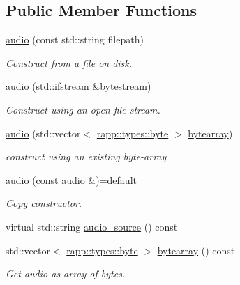 \subsection*{Public Member Functions}
\begin{DoxyCompactItemize}
\item 
\hyperlink{classrapp_1_1object_1_1audio_a01c7492e030076cf3f579fee73990b96}{audio} (const std\-::string filepath)
\begin{DoxyCompactList}\small\item\em Construct from a file on disk. \end{DoxyCompactList}\item 
\hyperlink{classrapp_1_1object_1_1audio_a5f8b8dea6ffe4c30bb7af66244a3cd48}{audio} (std\-::ifstream \&bytestream)
\begin{DoxyCompactList}\small\item\em Construct using an open file stream. \end{DoxyCompactList}\item 
\hyperlink{classrapp_1_1object_1_1audio_af6cb71fb68efdfa45194b640d6076d94}{audio} (std\-::vector$<$ \hyperlink{namespacerapp_1_1types_a1dbc9dc2ab4507d8fb58ac3a204d307b}{rapp\-::types\-::byte} $>$ \hyperlink{classrapp_1_1object_1_1audio_aa2a7060842d1c1109ef2f0962c8351d4}{bytearray})
\begin{DoxyCompactList}\small\item\em construct using an existing byte-\/array \end{DoxyCompactList}\item 
\hyperlink{classrapp_1_1object_1_1audio_a55ba2b7c267b6e6ad168611d7141e239}{audio} (const \hyperlink{classrapp_1_1object_1_1audio}{audio} \&)=default
\begin{DoxyCompactList}\small\item\em Copy constructor. \end{DoxyCompactList}\item 
virtual std\-::string \hyperlink{classrapp_1_1object_1_1audio_a6eddc8038cd4fc4bff131175f7072893}{audio\-\_\-source} () const 
\item 
std\-::vector$<$ \hyperlink{namespacerapp_1_1types_a1dbc9dc2ab4507d8fb58ac3a204d307b}{rapp\-::types\-::byte} $>$ \hyperlink{classrapp_1_1object_1_1audio_aa2a7060842d1c1109ef2f0962c8351d4}{bytearray} () const 
\begin{DoxyCompactList}\small\item\em Get audio as array of bytes. \end{DoxyCompactList}\item 

\end{DoxyCompactItemize}
